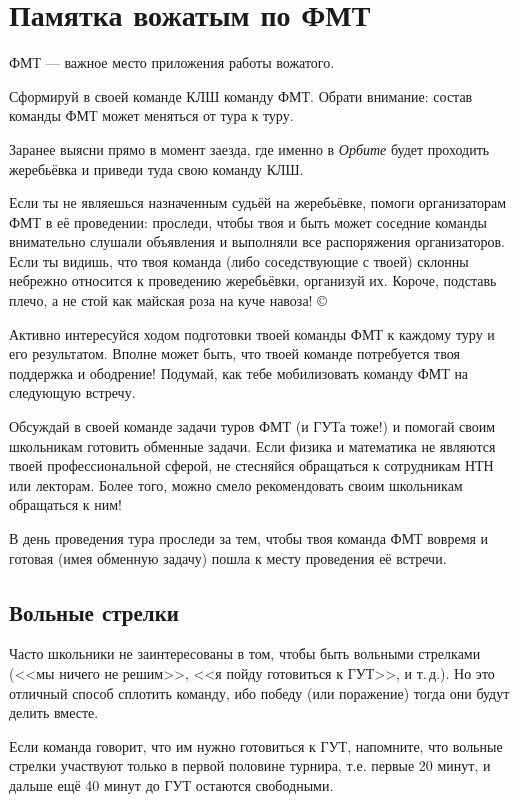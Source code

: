\documentclass[12pt,a4paper]{article}
\begin{document}
\section*{Памятка вожатым по ФМТ}
ФМТ --- важное место приложения работы вожатого.
\begin{list}{.}{\leftmargin=10mm  \topsep=0mm  \itemsep=1pt \parsep=0mm \itemindent=-15pt}
\item Сформируй в своей команде КЛШ команду ФМТ. Обрати внимание: состав команды ФМТ может меняться от тура к туру.
\item Заранее выясни прямо в момент заезда, где именно в \textsl{Орбите} будет проходить жеребьёвка и приведи туда свою команду КЛШ.
\item Если ты не являешься назначенным судьёй на жеребьёвке, помоги организаторам ФМТ в её проведении: проследи, чтобы твоя и быть может соседние команды внимательно слушали объявления и выполняли все распоряжения организаторов. Если ты видишь, что твоя команда (либо соседствующие с твоей) склонны небрежно относится к проведению жеребьёвки, организуй их. Короче, подставь плечо, а не стой как майская роза на куче навоза! \copyright
\item Активно интересуйся ходом подготовки твоей команды ФМТ к каждому туру и его результатом. Вполне может быть, что твоей команде потребуется твоя поддержка и ободрение! Подумай, как тебе мобилизовать команду ФМТ на следующую встречу.
\item Обсуждай в своей команде задачи туров ФМТ (и ГУТа тоже!) и помогай своим школьникам готовить обменные задачи. Если физика и математика не являются твоей профессиональной сферой, не стесняйся обращаться к сотрудникам НТН или лекторам. Более того, можно смело рекомендовать своим школьникам обращаться к ним!
\item В день проведения тура проследи за тем, чтобы твоя команда ФМТ вовремя и готовая (имея обменную задачу) пошла к месту проведения её встречи.
\end{list}

\subsection*{Вольные стрелки}
Часто школьники не заинтересованы в том, чтобы быть вольными стрелками (<<мы ничего не решим>>, <<я пойду готовиться к ГУТ>>, и т.\,д.). Но это отличный способ сплотить команду, ибо победу (или поражение) тогда они будут делить вместе.

Если команда говорит, что им нужно готовиться к ГУТ, напомните, что вольные стрелки участвуют только в первой половине турнира, т.е. первые 20 минут, и дальше ещё 40 минут до ГУТ остаются свободными.
\end{document}
